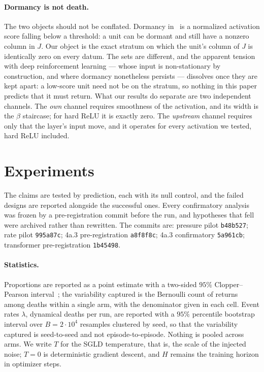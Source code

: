 \documentclass[11pt]{article}
\theoremstyle{definition}
\theoremstyle{remark}
\begin{document}
\paragraph{Dormancy is not death.} The two objects should not be conflated.
Dormancy in~\cite{Sokar23} is a normalized activation score falling below a
threshold: a unit can be dormant and still have a nonzero column in $J$. Our
object is the exact stratum on which the unit's column of $J$ is identically zero
on every datum. The sets are different, and the apparent tension with deep
reinforcement learning --- whose input is non-stationary by construction, and
where dormancy nonetheless persists --- dissolves once they are kept apart: a
low-score unit need not be on the stratum, so nothing in this paper predicts
that it must return. What our results do separate are two independent channels. The
\emph{own} channel requires smoothness of the activation, and its width is the
$\beta$ staircase; for hard ReLU it is exactly zero. The \emph{upstream} channel
requires only that the layer's input move, and it operates for every activation
we tested, hard ReLU included.

\section{Experiments}\label{sec:experiments}

The claims are tested by prediction, each with its null control, and the failed
designs are reported alongside the successful ones. Every confirmatory analysis
was frozen by a pre-registration commit before the run, and hypotheses that fell
were archived rather than rewritten. The commits are: pressure pilot
\texttt{b48b527}; rate pilot \texttt{995a87c}; 4a.3 pre-registration
\texttt{a8f8f8c}; 4a.3 confirmatory \texttt{5a961cb}; transformer
pre-registration \texttt{1b45498}.

\paragraph{Statistics.}
Proportions are reported as a point estimate with a two-sided $95\%$
Clopper--Pearson interval~\cite{CP34}; the variability captured is the Bernoulli
count of returns among deaths within a single arm, with the denominator given in
each cell. Event rates $\lambda$, dynamical deaths per run, are reported with a
$95\%$ percentile bootstrap interval over $B=2\cdot10^{4}$ resamples clustered by
seed, so that the variability captured is seed-to-seed and not
episode-to-episode. Nothing is pooled across arms. We write $T$ for the SGLD
temperature, that is, the scale of the injected noise; $T=0$ is deterministic
gradient descent, and $H$ remains the training horizon in optimizer steps.
\end{document}
